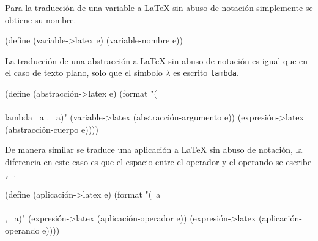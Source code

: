 \documentclass[letterpaper,twoside,openright,11pt]{book}
\begin{document}
Para la traducción de una variable a \LaTeX{} sin abuso de notación simplemente se obtiene su nombre.

\nwenddocs{}\plusendmoddef
(define (variable->latex e)
  (variable-nombre e))

\eatline
{}\nwendcode{}\nwdocspar

La traducción de una abstracción a \LaTeX{} sin abuso de notación es igual que en el caso de texto plano, solo que el símbolo \( λ \) es escrito {\tt{}{}lambda}.

\nwenddocs{}\plusendmoddef
(define (abstracción->latex e)
  (format "(\\\\lambda ~a . ~a)"
          (variable->latex (abstracción-argumento e))
          (expresión->latex (abstracción-cuerpo e))))

\eatline
{}\nwendcode{}\nwdocspar

De manera similar se traduce una aplicación a \LaTeX{} sin abuso de notación, la diferencia en este caso es que el espacio entre el operador y el operando se escribe {\tt{}{},\ }.

\nwenddocs{}\plusendmoddef
(define (aplicación->latex e)
  (format "(~a\\\\, ~a)"
          (expresión->latex (aplicación-operador e))
          (expresión->latex (aplicación-operando e))))
\end{document}
